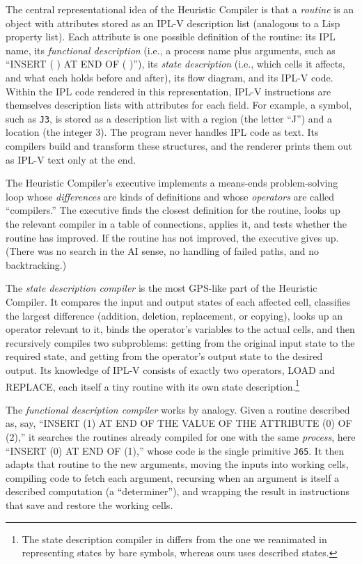 \documentclass[11pt]{article}
\begin{document}
The central representational idea of the Heuristic Compiler is that a
\emph{routine} is an object with attributes stored as an IPL-V
description list (analogous to a Lisp property list). Each attribute
is one possible definition of the routine: its IPL name, its
\emph{functional description} (i.e., a process name plus arguments,
such as ``INSERT ( ) AT END OF ( )''), its \emph{state description}
(i.e., which cells it affects, and what each holds before and after),
its flow diagram, and its IPL-V code. Within the IPL code rendered in
this representation, IPL-V instructions are themselves description
lists with attributes for each field. For example, a symbol, such as
\texttt{J3}, is stored as a description list with a region (the
letter ``J'') and a location (the integer 3). The program never handles
IPL code as text. Its compilers build and transform these structures,
and the renderer prints them out as IPL-V text only at the end.

The Heuristic Compiler's executive implements a means-ends
problem-solving loop whose \emph{differences} are kinds of definitions
and whose \emph{operators} are called ``compilers.'' The executive
finds the closest definition for the routine, looks up the relevant
compiler in a table of connections, applies it, and tests whether the
routine has improved. If the routine has not improved, the executive
gives up. (There was no search in the AI sense, no handling of failed
paths, and no backtracking.)

The \emph{state description compiler} is the most GPS-like part of the
Heuristic Compiler. It compares the input and output states of each
affected cell, classifies the largest difference (addition, deletion,
replacement, or copying), looks up an operator relevant to it, binds
the operator's variables to the actual cells, and then recursively
compiles two subproblems: getting from the original input state to the
required state, and getting from the operator's output state to the
desired output. Its knowledge of IPL-V consists of exactly two
operators, LOAD and REPLACE, each itself a tiny routine with its own
state description.\footnote{The state description compiler in
\cite{simonRM3588} differs from the one we reanimated in representing
states by bare symbols, whereas ours uses described states.}

The \emph{functional description compiler} works by analogy. Given a
routine described as, say, ``INSERT (1) AT END OF THE VALUE OF THE
ATTRIBUTE (0) OF (2),'' it searches the routines already compiled for
one with the same \emph{process}, here ``INSERT (0) AT END OF (1),''
whose code is the single primitive \texttt{J65}. It then adapts that
routine to the new arguments, moving the inputs into working cells,
compiling code to fetch each argument, recursing when an argument is
itself a described computation (a ``determiner''), and wrapping the
result in instructions that save and restore the working cells.
\end{document}
